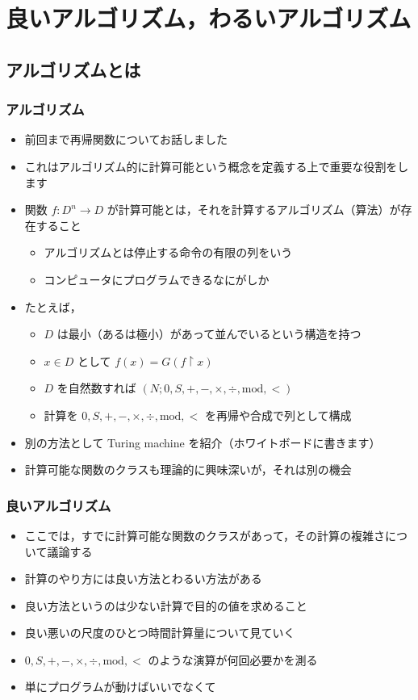 \section{良いアルゴリズム，わるいアルゴリズム}
\subsection{アルゴリズムとは}
\begin{frame}
\frametitle{アルゴリズム}
  \begin{itemize}
\item 前回まで再帰関数についてお話しました
\item これはアルゴリズム的に計算可能という概念を定義する上で重要な役割をします
\item 関数 \(f:D^n\rightarrow D\) が計算可能とは，それを計算するアルゴリズム（算法）が存在すること
    \begin{itemize}
\item アルゴリズムとは停止する命令の有限の列をいう
\item コンピュータにプログラムできるなにがしか
    \end{itemize}
\item たとえば，
    \begin{itemize}
\item $D$ は最小（あるは極小）があって並んでいるという構造を持つ
\item \(x\in D\) として \(f(x)=G(f\upharpoonright x)\)
\item $D$ を自然数すれば \((N;0,S,+,-,\times,\div,\mathrm{mod},<)\)
\item 計算を \(0,S,+,-,\times,\div,\mathrm{mod},<\) を再帰や合成で列として構成
    \end{itemize}
\item 別の方法として Turing machine を紹介（ホワイトボードに書きます）
\item 計算可能な関数のクラスも理論的に興味深いが，それは別の機会
  \end{itemize}
\end{frame}
\begin{frame}
\frametitle{良いアルゴリズム}
  \begin{itemize}
\item ここでは，すでに計算可能な関数のクラスがあって，その計算の複雑さについて議論する
\item 計算のやり方には良い方法とわるい方法がある
\item 良い方法というのは少ない計算で目的の値を求めること
\item 良い悪いの尺度のひとつ時間計算量について見ていく
\item \(0,S,+,-,\times,\div,\mathrm{mod},<\) のような演算が何回必要かを測る
\item 単にプログラムが動けばいいでなくて
  \end{itemize}
\end{frame}
